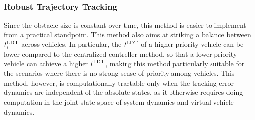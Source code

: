 \subsubsection{Robust Trajectory Tracking}
Since the obstacle size is constant over time, this method is easier to implement from a practical standpoint. This method also aims at striking a balance between $t^\text{LDT}_i$ across vehicles. In particular, the $t^\text{LDT}$ of a higher-priority vehicle can be lower compared to the centralized controller method, so that a lower-priority vehicle can achieve a higher $t^\text{LDT}$, making this method particularly suitable for the scenarios where there is no strong sense of priority among vehicles. This method, however, is computationally tractable only when the tracking error dynamics are independent of the absolute states, as it otherwise requires doing computation in the joint state space of system dynamics and virtual vehicle dynamics. 